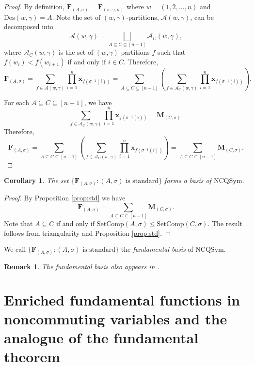 \documentclass[11pt]{amsart}
\newtheorem{Corollary}[Theorem]{Corollary}
\newtheorem{Remark}[Theorem]{Remark}
\numberwithin{equation}{section}
\newcommand{\NCQSym}{\mathrm{NCQSym}}
\newcommand{\SetComp}{\mathrm{SetComp}}
\newcommand{\Des}{\mathrm{Des}}
\begin{document}
\begin{proof}
	By definition, $\mathbf{F}_{(A,\sigma)}=\mathbf{F}_{(w,\gamma,\sigma)}$ where $w=(1,2,\dots,n)$ and $\Des(w,\gamma)=A$. Note the set of $(w,\gamma)$-partitions, $\mathcal{A}(w,\gamma)$, can be decomposed into
	$$\mathcal{A}(w,\gamma)=\bigsqcup_{A\subseteq C\subseteq[n-1]}\mathcal{A}_C(w,\gamma),$$
	where $\mathcal{A}_C(w,\gamma)$ is the set of $(w,\gamma)$-partitions $f$ such that $f(w_i)<f(w_{i+1})$ if and only if $i\in C$.
	Therefore,
	$$\mathbf{F}_{(A,\sigma)}=\sum_{f\in\mathcal{A}(w,\gamma)}\prod_{i=1}^{n}\mathbf{x}_{f(\sigma^{-1}(i))}=\sum_{A\subseteq C\subseteq[n-1]}\left(\sum_{f\in\mathcal{A}_C(w,\gamma)}\prod_{i=1}^{n}\mathbf{x}_{f(\sigma^{-1}(i))}\right).$$
	
	For each $A\subseteq C\subseteq[n-1]$, we have $$\sum_{f\in\mathcal{A}_C(w,\gamma)}\prod_{i=1}^{n}\mathbf{x}_{f(\sigma^{-1}(i))}=\mathbf{M}_{(C,\sigma)}.$$
	Therefore,
	$$\mathbf{F}_{(A,\sigma)}=\sum_{A\subseteq C\subseteq[n-1]}\left(\sum_{f\in\mathcal{A}_C(w,\gamma)}\prod_{i=1}^{n}\mathbf{x}_{f(\sigma^{-1}(i))}\right)=\sum_{A\subseteq C\subseteq[n-1]}\mathbf{M}_{(C,\sigma)}.$$
\end{proof}

\begin{Corollary}\label{cor:Fbasis}
	The set $\{\mathbf{F}_{(A,\sigma)}:(A,\sigma)\text{ is standard}\}$ forms a basis of $\NCQSym$.
\end{Corollary}


\begin{proof} 
By Proposition  \ref{prop:std} we have 
$$ \mathbf{F}_{(A,\sigma)}=\sum_{A\subseteq C\subseteq[n-1]}\mathbf{M}_{(C,\sigma)}.$$
Note that $A\subseteq C$ if and only if $\SetComp(A,\sigma)\leq\SetComp(C,\sigma)$. The result follows from triangularity and Proposition \ref{prop:std}.
\end{proof}

We call $\{\mathbf{F}_{(A,\sigma)}:(A,\sigma)\text{ is standard}\}$ the \emph{fundamental basis}  of $\NCQSym$.


\begin{Remark}\label{rem:fund}
	The fundamental basis also appears in \cite[Section 11]{ALvW23}.
\end{Remark}





\section{Enriched fundamental functions in noncommuting variables and the analogue of the fundamental theorem}\label{sec:peak-en}
\end{document}
